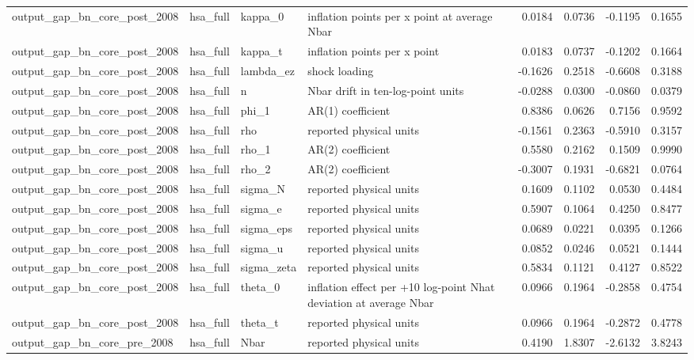 \begin{tabular}{llllrrrr}
output\_gap\_bn\_core\_post\_2008 & hsa\_full & kappa\_0 & inflation points per x point at average Nbar & 0.0184 & 0.0736 & -0.1195 & 0.1655 \\
output\_gap\_bn\_core\_post\_2008 & hsa\_full & kappa\_t & inflation points per x point & 0.0183 & 0.0737 & -0.1202 & 0.1664 \\
output\_gap\_bn\_core\_post\_2008 & hsa\_full & lambda\_ez & shock loading & -0.1626 & 0.2518 & -0.6608 & 0.3188 \\
output\_gap\_bn\_core\_post\_2008 & hsa\_full & n & Nbar drift in ten-log-point units & -0.0288 & 0.0300 & -0.0860 & 0.0379 \\
output\_gap\_bn\_core\_post\_2008 & hsa\_full & phi\_1 & AR(1) coefficient & 0.8386 & 0.0626 & 0.7156 & 0.9592 \\
output\_gap\_bn\_core\_post\_2008 & hsa\_full & rho & reported physical units & -0.1561 & 0.2363 & -0.5910 & 0.3157 \\
output\_gap\_bn\_core\_post\_2008 & hsa\_full & rho\_1 & AR(2) coefficient & 0.5580 & 0.2162 & 0.1509 & 0.9990 \\
output\_gap\_bn\_core\_post\_2008 & hsa\_full & rho\_2 & AR(2) coefficient & -0.3007 & 0.1931 & -0.6821 & 0.0764 \\
output\_gap\_bn\_core\_post\_2008 & hsa\_full & sigma\_N & reported physical units & 0.1609 & 0.1102 & 0.0530 & 0.4484 \\
output\_gap\_bn\_core\_post\_2008 & hsa\_full & sigma\_e & reported physical units & 0.5907 & 0.1064 & 0.4250 & 0.8477 \\
output\_gap\_bn\_core\_post\_2008 & hsa\_full & sigma\_eps & reported physical units & 0.0689 & 0.0221 & 0.0395 & 0.1266 \\
output\_gap\_bn\_core\_post\_2008 & hsa\_full & sigma\_u & reported physical units & 0.0852 & 0.0246 & 0.0521 & 0.1444 \\
output\_gap\_bn\_core\_post\_2008 & hsa\_full & sigma\_zeta & reported physical units & 0.5834 & 0.1121 & 0.4127 & 0.8522 \\
output\_gap\_bn\_core\_post\_2008 & hsa\_full & theta\_0 & inflation effect per +10 log-point Nhat deviation at average Nbar & 0.0966 & 0.1964 & -0.2858 & 0.4754 \\
output\_gap\_bn\_core\_post\_2008 & hsa\_full & theta\_t & reported physical units & 0.0966 & 0.1964 & -0.2872 & 0.4778 \\
output\_gap\_bn\_core\_pre\_2008 & hsa\_full & Nbar & reported physical units & 0.4190 & 1.8307 & -2.6132 & 3.8243 \\

\end{tabular}
